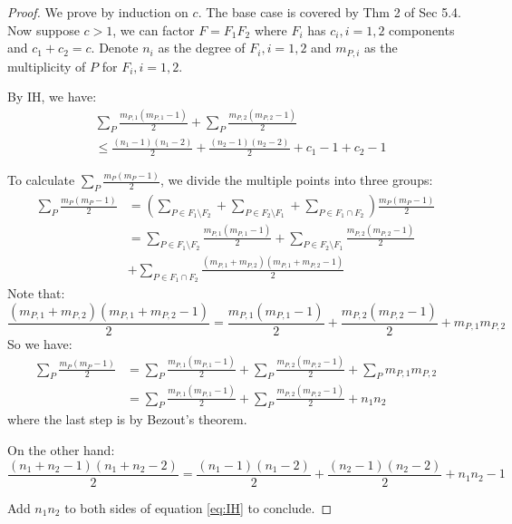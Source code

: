 \documentclass{solution}
\begin{document}
\begin{proof}
    We prove by induction on $c$. The base case is covered by Thm 2 of Sec 5.4. Now suppose $c \gt 1$, we can factor $F = F_1F_2$ where $F_i$ has $c_i, i = 1, 2$ components and $c_1 + c_2 = c$. Denote $n_i$ as the degree of $F_i, i = 1, 2$ and $m_{P, i}$ as the multiplicity of $P$ for $F_i, i = 1, 2$.

    By IH, we have:
    \begin{equation}\label{eq:IH}
        \begin{aligned}
        &\sum\limits_P \frac{m_{P, 1}(m_{P, 1} - 1)}{2} + \sum\limits_P \frac{m_{P, 2}(m_{P, 2} - 1)}{2}\\
        &\le \frac{(n_1 - 1)(n_1 - 2)}{2} + \frac{(n_2 - 1)(n_2 - 2)}{2} + c_1 - 1 + c_2 - 1
        \end{aligned}
    \end{equation}
    
    To calculate $\sum\limits_{P} \frac{m_P(m_P - 1)}{2}$, we divide the multiple points into three groups:
    $$
        \begin{aligned}
        \sum\limits_{P} \frac{m_P(m_P - 1)}{2} &= \left(\sum\limits_{P \in F_1 \setminus F_2} + \sum\limits_{P \in F_2 \setminus F_1} + \sum\limits_{P \in F_1 \cap F_2}\right) \frac{m_P(m_P - 1)}{2} \\
        &= \sum\limits_{P \in F_1 \setminus F_2} \frac{m_{P, 1}(m_{P, 1} - 1)}{2} + \sum\limits_{P \in F_2 \setminus F_1} \frac{m_{P, 2}(m_{P, 2} - 1)}{2} \\
        &+ \sum\limits_{P \in F_1 \cap F_2} \frac{(m_{P, 1} + m_{P, 2})(m_{P, 1} + m_{P, 2} - 1)}{2}
        \end{aligned}
    $$
    Note that:
    $$\frac{(m_{P, 1} + m_{P, 2})(m_{P, 1} + m_{P, 2} - 1)}{2} = \frac{m_{P, 1}(m_{P, 1} - 1)}{2} + \frac{m_{P, 2}(m_{P, 2} - 1)}{2} + m_{P, 1} m_{P, 2}$$
    So we have:
    $$
        \begin{aligned}
        \sum\limits_{P} \frac{m_P(m_P - 1)}{2} &= \sum\limits_{P} \frac{m_{P, 1}(m_{P, 1} - 1)}{2} + \sum\limits_{P} \frac{m_{P, 2}(m_{P, 2} - 1)}{2} + \sum\limits_{P} m_{P,1} m_{P, 2} \\
        &= \sum\limits_{P} \frac{m_{P, 1}(m_{P, 1} - 1)}{2} + \sum\limits_{P} \frac{m_{P, 2}(m_{P, 2} - 1)}{2} + n_1n_2
        \end{aligned}
    $$
    where the last step is by Bezout's theorem.

    On the other hand:
    $$\frac{(n_1 + n_2 - 1)(n_1 + n_2 - 2)}{2} = \frac{(n_1 - 1)(n_1 - 2)}{2} + \frac{(n_2 - 1)(n_2 - 2)}{2} + n_1n_2 - 1$$
    
    Add $n_1n_2$ to both sides of equation \ref{eq:IH} to conclude.

\end{proof}
\end{document}
